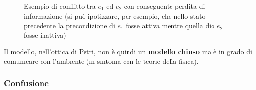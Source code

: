 \documentclass[a4paper,12pt, oneside]{book}
\begin{document}
\begin{definizione}
\begin{figure}[H]
    \caption{Esempio di conflitto tra $e_1$ ed
      $e_2$ con conseguente perdita di informazione (si può ipotizzare, per
      esempio, che nello stato precedente la precondizione di $e_1$ fosse attiva
      mentre quella dio $e_2$ fosse inattiva)} 
  \end{figure}
  Il modello, nell'ottica di Petri, non è quindi un \textbf{modello chiuso} ma è
  in grado di comunicare con l'ambiente (in sintonia con le teorie della
  fisica). 
\end{definizione}
\subsubsection{Confusione}
\end{document}
